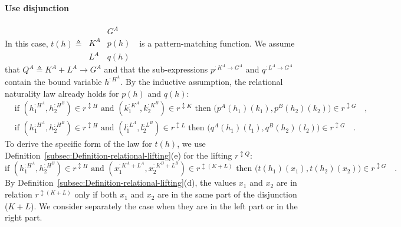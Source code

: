 \paragraph{Use disjunction}

In this case, $t(h)\triangleq\,\begin{array}{|c||c|}
 & G^{A}\\
\hline K^{A} & p(h)\\
L^{A} & q(h)
\end{array}\,\,$ is a pattern-matching function. We assume that $Q^{A}\triangleq K^{A}+L^{A}\rightarrow G^{A}$
and that the sub-expressions $p^{:K^{A}\rightarrow G^{A}}$ and $q^{:L^{A}\rightarrow G^{A}}$
contain the bound variable $h^{:H^{A}}$. By the inductive assumption,
the relational naturality law already holds for $p(h)$ and $q(h)$:
\begin{align*}
 & \text{if }(h_{1}^{:H^{A}},h_{2}^{:H^{B}})\in r^{\updownarrow H}\text{ and }(k_{1}^{:K^{A}},k_{2}^{:K^{B}})\in r^{\updownarrow K}\text{ then }\big(p^{A}(h_{1})(k_{1}),p^{B}(h_{2})(k_{2})\big)\in r^{\updownarrow G}\quad,\\
 & \text{if }(h_{1}^{:H^{A}},h_{2}^{:H^{B}})\in r^{\updownarrow H}\text{ and }(l_{1}^{:L^{A}},l_{2}^{:L^{B}})\in r^{\updownarrow L}\text{ then }\big(q^{A}(h_{1})(l_{1}),q^{B}(h_{2})(l_{2})\big)\in r^{\updownarrow G}\quad.
\end{align*}
To derive the specific form of the law for $t(h)$, we use Definition~\ref{subsec:Definition-relational-lifting}(e)
for the lifting $r^{\updownarrow Q}$:
\[
\text{if }(h_{1}^{:H^{A}},h_{2}^{:H^{B}})\in r^{\updownarrow H}\text{ and }(x_{1}^{:K^{A}+L^{A}},x_{2}^{:K^{B}+L^{B}})\in r^{\updownarrow(K+L)}\text{ then }\big(t(h_{1})(x_{1}),t(h_{2})(x_{2})\big)\in r^{\updownarrow G}\quad.
\]
By Definition~\ref{subsec:Definition-relational-lifting}(d), the
values $x_{1}$ and $x_{2}$ are in relation $r^{\updownarrow(K+L)}$
only if both $x_{1}$ and $x_{2}$ are in the same part of the disjunction
($K+L$). We consider separately the case when they are in the left
part or in the right part.

